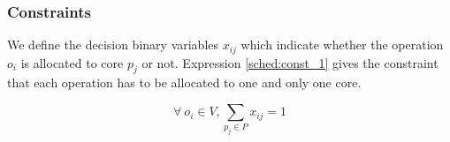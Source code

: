 %
%
%
%
%
%

\subsubsection{Constraints}

We define the decision binary variables $x_{ij}$ which indicate whether the operation $o_i$ is allocated to core $p_j$ or not. Expression \ref{sched:const_1} gives the constraint that each operation has to be allocated to one and only one core.

\begin{equation}
\forall\ o_i \in V, \sum_{p_j \in P}x_{ij}=1
\label{sched:const_1}
\end{equation}

